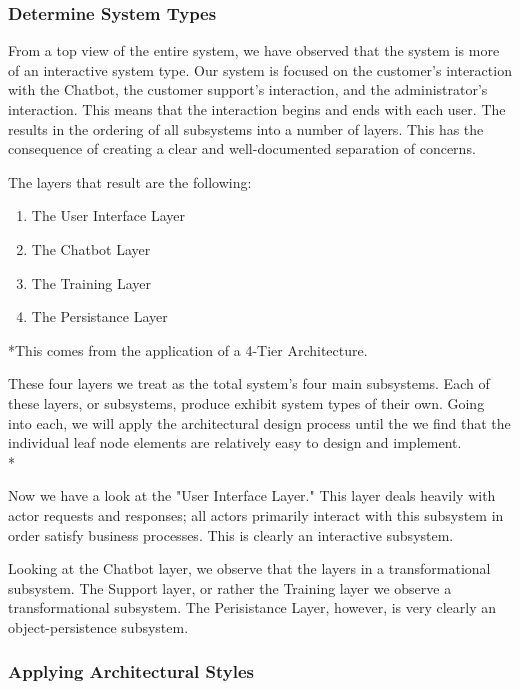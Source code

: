 \documentclass[11pt]{article}
\begin{document}
\subsubsection{Determine System Types}

From a top view of the entire system, we have observed that the system is more of an interactive system type. Our system is focused on the customer's interaction with the Chatbot, the customer support's interaction, and the administrator's interaction. This means that the interaction begins and ends with each user. The results in the ordering of all subsystems into a number of layers. This has the consequence of creating a clear and well-documented separation of concerns\cite{Book:2}. 

The layers that result are the following:
\begin{enumerate}
	\item The User Interface Layer
	\item The Chatbot Layer
	\item The Training Layer
	\item The Persistance Layer
\end{enumerate}
*This comes from the application of a 4-Tier Architecture.

These four layers we treat as the total system's four main subsystems. Each of these layers, or subsystems, produce exhibit system types of their own. Going into each, we will apply the architectural design process until the we find that the individual leaf node elements are relatively easy to design and implement\cite{Book:1}. \\*

Now we have a look at the "User Interface Layer." This layer deals heavily with actor requests and responses; all actors primarily interact with this subsystem in order satisfy business processes. This is clearly an interactive subsystem.\par

Looking at the Chatbot layer, we observe that the layers in a transformational subsystem. The Support layer, or rather the Training layer we observe a transformational subsystem. The Perisistance Layer, however, is very clearly an object-persistence subsystem.

\subsubsection{Applying Architectural Styles}
\end{document}
